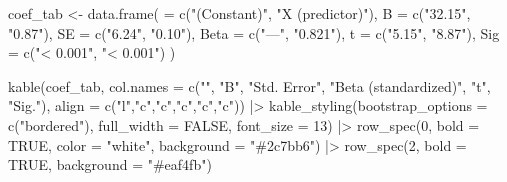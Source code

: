 \documentclass[
  12pt,
  letterpaper,
]{book}
\newenvironment{Shaded}{\begin{snugshade}}{\end{snugshade}}
\newcommand{\AttributeTok}[1]{\textcolor[rgb]{0.40,0.45,0.13}{#1}}
\newcommand{\ConstantTok}[1]{\textcolor[rgb]{0.56,0.35,0.01}{#1}}
\newcommand{\DecValTok}[1]{\textcolor[rgb]{0.68,0.00,0.00}{#1}}
\newcommand{\FunctionTok}[1]{\textcolor[rgb]{0.28,0.35,0.67}{#1}}
\newcommand{\NormalTok}[1]{\textcolor[rgb]{0.00,0.23,0.31}{#1}}
\newcommand{\OtherTok}[1]{\textcolor[rgb]{0.00,0.23,0.31}{#1}}
\newcommand{\SpecialCharTok}[1]{\textcolor[rgb]{0.37,0.37,0.37}{#1}}
\newcommand{\StringTok}[1]{\textcolor[rgb]{0.13,0.47,0.30}{#1}}
\begin{document}
\begin{Shaded}
\begin{Highlighting}[]
\NormalTok{coef\_tab }\OtherTok{\textless{}{-}} \FunctionTok{data.frame}\NormalTok{(}
  \StringTok{\textasciigrave{}}\AttributeTok{ }\StringTok{\textasciigrave{}} \OtherTok{=} \FunctionTok{c}\NormalTok{(}\StringTok{"(Constant)"}\NormalTok{, }\StringTok{"X (predictor)"}\NormalTok{),}
  \AttributeTok{B =} \FunctionTok{c}\NormalTok{(}\StringTok{"32.15"}\NormalTok{, }\StringTok{"0.87"}\NormalTok{),}
  \AttributeTok{SE =} \FunctionTok{c}\NormalTok{(}\StringTok{"6.24"}\NormalTok{, }\StringTok{"0.10"}\NormalTok{),}
  \AttributeTok{Beta =} \FunctionTok{c}\NormalTok{(}\StringTok{"—"}\NormalTok{, }\StringTok{"0.821"}\NormalTok{),}
  \AttributeTok{t =} \FunctionTok{c}\NormalTok{(}\StringTok{"5.15"}\NormalTok{, }\StringTok{"8.87"}\NormalTok{),}
  \AttributeTok{Sig =} \FunctionTok{c}\NormalTok{(}\StringTok{"\textless{} 0.001"}\NormalTok{, }\StringTok{"\textless{} 0.001"}\NormalTok{)}
\NormalTok{)}

\FunctionTok{kable}\NormalTok{(coef\_tab,}
      \AttributeTok{col.names =} \FunctionTok{c}\NormalTok{(}\StringTok{""}\NormalTok{, }\StringTok{"B"}\NormalTok{, }\StringTok{"Std. Error"}\NormalTok{, }\StringTok{"Beta (standardized)"}\NormalTok{, }\StringTok{"t"}\NormalTok{, }\StringTok{"Sig."}\NormalTok{),}
      \AttributeTok{align =} \FunctionTok{c}\NormalTok{(}\StringTok{"l"}\NormalTok{,}\StringTok{"c"}\NormalTok{,}\StringTok{"c"}\NormalTok{,}\StringTok{"c"}\NormalTok{,}\StringTok{"c"}\NormalTok{,}\StringTok{"c"}\NormalTok{)) }\SpecialCharTok{|\textgreater{}}
  \FunctionTok{kable\_styling}\NormalTok{(}\AttributeTok{bootstrap\_options =} \FunctionTok{c}\NormalTok{(}\StringTok{"bordered"}\NormalTok{),}
                \AttributeTok{full\_width =} \ConstantTok{FALSE}\NormalTok{, }\AttributeTok{font\_size =} \DecValTok{13}\NormalTok{) }\SpecialCharTok{|\textgreater{}}
  \FunctionTok{row\_spec}\NormalTok{(}\DecValTok{0}\NormalTok{, }\AttributeTok{bold =} \ConstantTok{TRUE}\NormalTok{, }\AttributeTok{color =} \StringTok{"white"}\NormalTok{, }\AttributeTok{background =} \StringTok{"\#2c7bb6"}\NormalTok{) }\SpecialCharTok{|\textgreater{}}
  \FunctionTok{row\_spec}\NormalTok{(}\DecValTok{2}\NormalTok{, }\AttributeTok{bold =} \ConstantTok{TRUE}\NormalTok{, }\AttributeTok{background =} \StringTok{"\#eaf4fb"}\NormalTok{)}
\end{Highlighting}
\end{Shaded}

\begingroup\fontsize{13}{15}\selectfont
\end{document}
